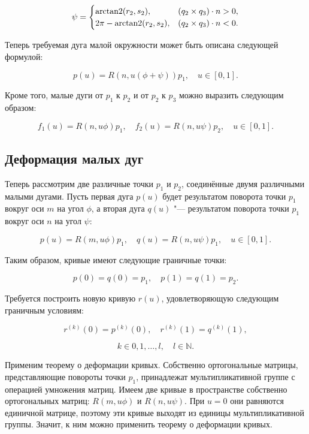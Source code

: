 \begin{equation}
\psi=
 \begin{cases}
   \operatorname{arctan2}(r_2,s_2),      & (q_2\times q_3)\cdot n>0, \\
   2\pi-\operatorname{arctan2}(r_2,s_2), & (q_2\times q_3)\cdot n<0.
 \end{cases}
\label{two-dimension-sphere-psi-angle}
\end{equation}

Теперь требуемая дуга малой окружности может быть описана следующей формулой:

\begin{equation}
p(u)=R(n,u(\phi+\psi))p_1, \quad u \in [0,1].
\label{two-dimension-arc}
\end{equation}

Кроме того, малые дуги от $p_1$ к $p_2$ и от $p_2$ к $p_3$ можно выразить следующим образом:

$$
f_1(u)=R(n,u\phi)p_1, \quad f_2(u)=R(n,u\psi)p_2, \quad u \in [0,1].
$$

\subsection*{Деформация малых дуг}

Теперь рассмотрим две различные точки $p_1$ и $p_2$, соединённые двумя различными малыми дугами. Пусть первая дуга
$p(u)$ будет результатом поворота точки $p_1$ вокруг оси $m$ на угол $\phi$, а вторая дуга $q(u)$ "--- результатом
поворота точки $p_1$ вокруг оси $n$ на угол $\psi$:

$$
p(u)=R(m,u\phi)p_1, \quad q(u)=R(n,u\psi)p_1, \quad u \in [0,1].
$$

Таким образом, кривые имеют следующие граничные точки:

$$
p(0)=q(0)=p_1, \quad p(1)=q(1)=p_2.
$$

Требуется построить новую кривую $r(u)$, удовлетворяющую следующим граничным условиям:

$$
r^{(k)}(0)=p^{(k)}(0), \quad r^{(k)}(1)=q^{(k)}(1),
$$

$$
k \in {0,1,\dots,l}, \quad l \in \mathbb{N}.
$$

Применим теорему о деформации кривых. Собственно ортогональные матрицы, представляющие повороты
точки $p_1$, принадлежат мультипликативной группе с операцией умножения матриц. Имеем две кривые в пространстве
собственно ортогональных матриц: $R(m,u\phi)$ и $R(n,u\psi)$. При $u=0$ они равняются единичной матрице, поэтому эти
кривые выходят из единицы мультипликативной группы. Значит, к ним можно применить теорему о деформации кривых.


